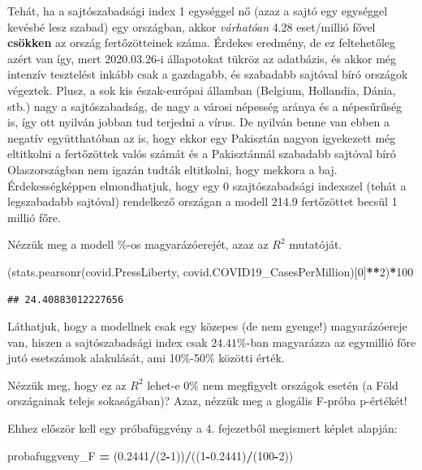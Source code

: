 \documentclass[
]{book}
\newenvironment{Shaded}{\begin{snugshade}}{\end{snugshade}}
\newcommand{\DecValTok}[1]{\textcolor[rgb]{0.00,0.00,0.81}{#1}}
\newcommand{\FloatTok}[1]{\textcolor[rgb]{0.00,0.00,0.81}{#1}}
\newcommand{\NormalTok}[1]{#1}
\newcommand{\OperatorTok}[1]{\textcolor[rgb]{0.81,0.36,0.00}{\textbf{#1}}}
\begin{document}
Tehát, ha a sajtószabadsági index 1 egységgel nő (azaz a sajtó egy egységgel kevésbé lesz szabad) egy országban, akkor \emph{várhatóan} 4.28 eset/millió fővel \textbf{csökken} az ország fertőzötteinek száma. Érdekes eredmény, de ez feltehetőleg azért van így, mert 2020.03.26-i állapotokat tükröz az adatbázis, és akkor még intenzív tesztelést inkább csak a gazdagabb, és szabadabb sajtóval bíró országok végeztek. Plusz, a sok kis észak-európai államban (Belgium, Hollandia, Dánia, stb.) nagy a sajtószabadság, de nagy a városi népesség aránya és a népesűrűség is, így ott nyilván jobban tud terjedni a vírus. De nyilván benne van ebben a negatív együtthatóban az is, hogy ekkor egy Pakisztán nagyon igyekezett még eltitkolni a fertőzöttek valós számát és a Pakisztánnál szabadabb sajtóval bíró Olaszországban nem igazán tudták eltitkolni, hogy mekkora a baj.
Érdekességképpen elmondhatjuk, hogy egy 0 szajtószabadsági indexszel (tehát a legszabadabb sajtóval) rendelkező országan a modell 214.9 fertőzöttet becsül 1 millió főre.

Nézzük meg a modell \%-os magyarázóerejét, azaz az \(R^2\) mutatóját.

\begin{Shaded}
\begin{Highlighting}[]
\NormalTok{(stats.pearsonr(covid.PressLiberty, covid.COVID19\_CasesPerMillion)[}\DecValTok{0}\NormalTok{]}\OperatorTok{**}\DecValTok{2}\NormalTok{)}\OperatorTok{*}\DecValTok{100}
\end{Highlighting}
\end{Shaded}

\begin{verbatim}
## 24.40883012227656
\end{verbatim}

Láthatjuk, hogy a modellnek csak egy közepes (de nem gyenge!) magyarázóereje van, hiszen a sajtószabadsági index csak \(24.41\%\)-ban magyarázza az egymillió főre jutó esetszámok alakulását, ami 10\%-50\% közötti érték.

Nézzük meg, hogy ez az \(R^2\) lehet-e \(0\%\) nem megfigyelt országok esetén (a Föld országainak telejs sokaságában)? Azaz, nézzük meg a glogális F-próba p-értékét!

Ehhez először kell egy próbafüggvény a 4. fejezetből megismert képlet alapján:

\begin{Shaded}
\begin{Highlighting}[]
\NormalTok{probafuggveny\_F }\OperatorTok{=}\NormalTok{ (}\FloatTok{0.2441}\OperatorTok{/}\NormalTok{(}\DecValTok{2}\OperatorTok{{-}}\DecValTok{1}\NormalTok{))}\OperatorTok{/}\NormalTok{((}\DecValTok{1}\OperatorTok{{-}}\FloatTok{0.2441}\NormalTok{)}\OperatorTok{/}\NormalTok{(}\DecValTok{100}\OperatorTok{{-}}\DecValTok{2}\NormalTok{))}
\end{Highlighting}
\end{Shaded}
\end{document}
